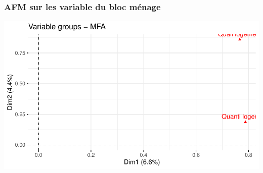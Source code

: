 \documentclass[11pt,a4paper, x11names]{article}\usepackage[]{graphicx}\usepackage[]{color}
\makeatletter
\def\maxwidth{ %
  \ifdim\Gin@nat@width>\linewidth
    \linewidth
  \else
    \Gin@nat@width
  \fi
}
\newenvironment{knitrout}{}{} %
\makeatother
\begin{document}
\subsubsection{AFM sur les variable du bloc ménage}
\begin{minipage}{0.49\linewidth}
\begin{mdframed}
\begin{knitrout}
\color{fgcolor}
\includegraphics[width=\maxwidth]{figure/unnamed-chunk-15-1} 
\end{knitrout}

\end{mdframed}
\end{minipage}


\end{document}
